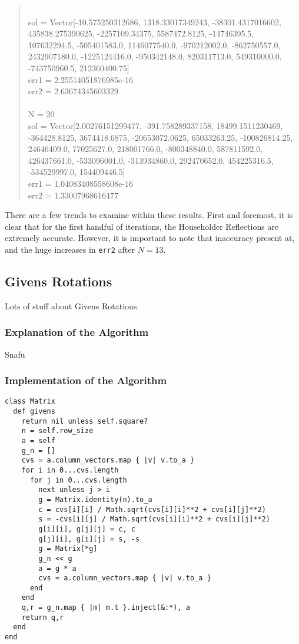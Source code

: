 \documentclass[letterpaper,12pt]{article}
\begin{document}
\begin{quote}
\\sol = Vector[-10.575250312686, 1318.33017349243, -38301.4317016602, 435838.275390625, -2257109.34375, 5587472.8125, -14746395.5, 107632294.5, -505401583.0, 1146077540.0, -970212002.0, -862750557.0, 2432907180.0, -1225124416.0, -950342148.0, 820311713.0, 549310000.0, -743750960.5, 212360400.75]
\\err1 = 2.25514051876985e-16
\\err2 = 2.63674345603329
\\
\\N = 20
\\sol = Vector[2.00276151299477, -391.758289337158, 18499.1511230469, -364428.8125, 3674418.6875, -20653072.0625, 65033263.25, -100826814.25, 24646409.0, 77025627.0, 218001766.0, -800348840.0, 587811592.0, 426437661.0, -533096001.0, -313934860.0, 292470652.0, 454225316.5, -534529997.0, 154409446.5]
\\err1 = 1.04083408558608e-16
\\err2 = 1.33007968616477
\end{quote}

There are a few trends to examine within these results.
First and foremost, it is clear that for the first handful of iterations, the
Householder Reflections are extremely accurate.
However, it is important to note that inaccuracy present at, and the huge
increases in \texttt{err2} after $N =13$.

\subsection{Givens Rotations}

Lots of stuff about Givens Rotations.

\subsubsection{Explanation of the Algorithm}

Snafu

\subsubsection{Implementation of the Algorithm}

\lstset{caption=QR Decomposition via Givens Rotations}
\begin{lstlisting}
class Matrix
  def givens
    return nil unless self.square?
    n = self.row_size
    a = self
    g_n = []
    cvs = a.column_vectors.map { |v| v.to_a }
    for i in 0...cvs.length
      for j in 0...cvs.length
        next unless j > i
        g = Matrix.identity(n).to_a
        c = cvs[i][i] / Math.sqrt(cvs[i][i]**2 + cvs[i][j]**2)
        s = -cvs[i][j] / Math.sqrt(cvs[i][i]**2 + cvs[i][j]**2)
        g[i][i], g[j][j] = c, c
        g[j][i], g[i][j] = s, -s
        g = Matrix[*g]
        g_n << g
        a = g * a
        cvs = a.column_vectors.map { |v| v.to_a }
      end
    end
    q,r = g_n.map { |m| m.t }.inject(&:*), a
    return q,r
  end
end
\end{lstlisting}
\end{document}
